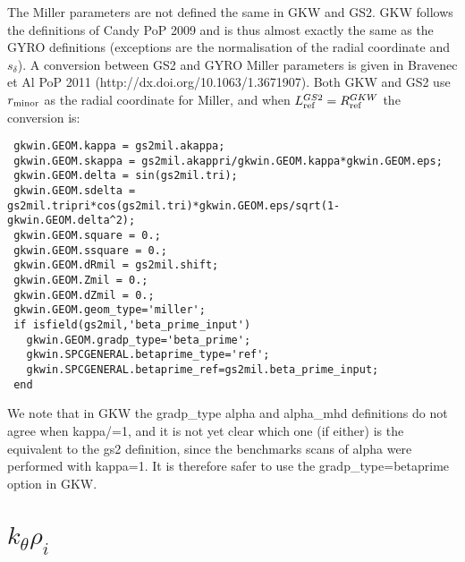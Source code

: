 \documentclass[a4paper,10pt]{article}
\begin{document}
The Miller parameters are not defined the same in GKW and GS2.  GKW follows the definitions of Candy PoP 2009 and is thus almost exactly the same as the GYRO definitions (exceptions are the normalisation of the radial coordinate and $s_\delta$).  A conversion between GS2 and GYRO Miller parameters is given in Bravenec et Al PoP 2011 (http://dx.doi.org/10.1063/1.3671907).  Both GKW and GS2 use $r_{\rm minor}$ as the radial coordinate for Miller, and when $L^{GS2}_{\rm ref} = R^{GKW}_{\rm ref}$ the conversion is:
\begin{verbatim}
 gkwin.GEOM.kappa = gs2mil.akappa;
 gkwin.GEOM.skappa = gs2mil.akappri/gkwin.GEOM.kappa*gkwin.GEOM.eps;
 gkwin.GEOM.delta = sin(gs2mil.tri);
 gkwin.GEOM.sdelta = gs2mil.tripri*cos(gs2mil.tri)*gkwin.GEOM.eps/sqrt(1-gkwin.GEOM.delta^2);
 gkwin.GEOM.square = 0.;
 gkwin.GEOM.ssquare = 0.;
 gkwin.GEOM.dRmil = gs2mil.shift; 
 gkwin.GEOM.Zmil = 0.;
 gkwin.GEOM.dZmil = 0.;
 gkwin.GEOM.geom_type='miller';
 if isfield(gs2mil,'beta_prime_input')
   gkwin.GEOM.gradp_type='beta_prime';
   gkwin.SPCGENERAL.betaprime_type='ref';
   gkwin.SPCGENERAL.betaprime_ref=gs2mil.beta_prime_input;
 end
\end{verbatim}

We note that in GKW the gradp\_type alpha and alpha\_mhd definitions do not agree when kappa/=1,
and it is not yet clear which one (if either) is the equivalent to the gs2 definition, since the benchmarks
scans of alpha were performed with kappa=1.  It is therefore safer to use the gradp\_type=betaprime option in
GKW.

\section{$k_\theta \rho_i$}
\end{document}
